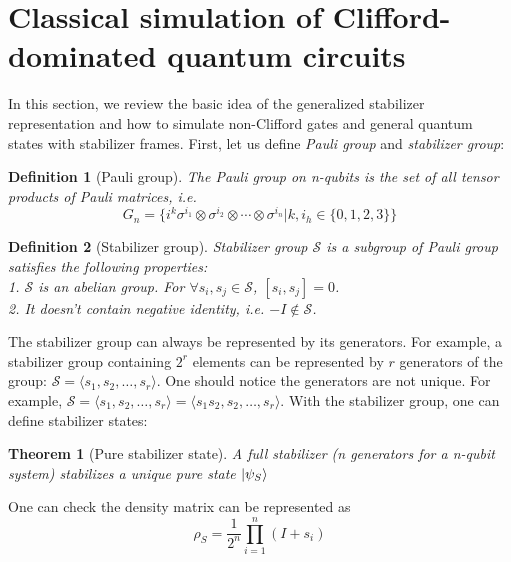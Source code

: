 \documentclass[a4paper,accepted=2024-07-10]{quantumarticle}
\newtheorem{theorem}{Theorem}[section]
\newtheorem{definition}{Definition}[section]
\begin{document}




\onecolumn
\newpage
\appendix
\section{\label{app:general-simulation}Classical simulation of Clifford-dominated quantum circuits}
In this section, we review the basic idea of the generalized stabilizer representation and how to simulate non-Clifford gates and general quantum states with stabilizer frames. First, let us define \emph{Pauli group} and \emph{stabilizer group}:
\begin{definition}[Pauli group]
    The \emph{Pauli group} on n-qubits is the set of all tensor products of Pauli matrices, i.e.
    \begin{equation}
        G_n = \{i^k \sigma^{i_1}\otimes \sigma^{i_2}\otimes \cdots \otimes \sigma^{i_{n}}|k,i_{h}\in\{0,1,2,3\}\}
    \end{equation}
\end{definition}

\begin{definition}[Stabilizer group]
    \emph{Stabilizer group} $\mathcal{S}$ is a subgroup of Pauli group satisfies the following properties:\\
        1. $\mathcal{S}$ is an abelian group. For $\forall s_i,s_j\in \mathcal{S}$, $[s_i,s_j]=0$. \\
        2. It doesn't contain negative identity, i.e. $-I \notin \mathcal{S}$.
\end{definition}
The stabilizer group can always be represented by its generators. For example, a stabilizer group containing $2^r$ elements can be represented by $r$ generators of the group: $\mathcal{S}=\langle s_1,s_2,\dots,s_r\rangle$. One should notice the generators are not unique. For example, $\mathcal{S}=\langle s_1,s_2,\dots,s_r\rangle=\langle s_1s_2,s_2,\dots,s_r\rangle$. With the stabilizer group, one can define stabilizer states:
\begin{theorem}[Pure stabilizer state]
    A full stabilizer (n generators for a n-qubit system) stabilizes a unique pure state $\ket{\psi_S}$
\end{theorem}
One can check the density matrix can be represented as 
\begin{equation}
    \rho_S=\dfrac{1}{2^n} \prod_{i=1}^{n}\left(I+s_i\right)
\end{equation}
\end{document}
